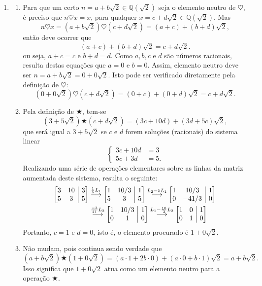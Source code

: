 \documentclass[12pt,a4paper]{article}
\makeatletter
\newcommand*\Q{\mathbb{Q}}
\newenvironment{amatrix}[1]{%
  \left[\begin{array}{@{}*{#1}{c}|c@{}}
}{%
  \end{array}\right]
}
\newcommand{\grstep}[2][\relax]{%
   \ensuremath{\mathrel{
       {\mathop{\longrightarrow}\limits^{#2\mathstrut}_{
                                     \begin{subarray}{l} #1 \end{subarray}}}}}}
\makeatother
\begin{document}
\begin{enumerate}
\item
\begin{enumerate}
\item Para que um certo $n = a + b\sqrt{2} \in \Q(\sqrt{2})$ seja o elemento neutro de $\heartsuit$, é preciso que $n \heartsuit x = x$, para qualquer $x = c+d\sqrt{2} \in \Q(\sqrt{2})$. Mas
\[
n \heartsuit x
= (a+b\sqrt{2}) \heartsuit (c+d\sqrt{2})
= (a+c) + (b+d)\sqrt{2},
\]
então deve ocorrer que
\[
(a+c) + (b+d)\sqrt{2} = c + d\sqrt{2}.
\]
ou seja, $a+c = c$ e $b+d = d$. Como $a,b,c$ e $d$ são números racionais, resulta destas equações que $a=0$ e $b=0$. Assim, elemento neutro deve ser $n = a + b\sqrt{2} = 0 + 0\sqrt{2}$. Isto pode ser verificado diretamente pela definição de $\heartsuit$:
\[
(0+0\sqrt{2}) \heartsuit (c+d\sqrt{2})
= (0+c) + (0+d)\sqrt{2}
= c + d\sqrt{2}.
\]
\item Pela definição de $\bigstar$, tem-se
\[
(3+5\sqrt{2}) \bigstar (c+d\sqrt{2})
= (3c+10d) + (3d+5c)\sqrt{2},
\]
que será igual a $3 + 5\sqrt{2}$ se $c$ e $d$ forem soluções (racionais) do sistema linear
\[
\begin{cases}
3c + 10d & = 3 \\
5c + 3d  & = 5.
\end{cases}
\]
Realizando uma série de operações elementares sobre as linhas da matriz aumentada deste sistema, resulta o seguinte:
\begin{align*}
\begin{amatrix}{2}
3 & 10 & 3 \\
5 & 3 & 5
\end{amatrix}
&
\grstep{ \frac{1}{5} L_1 }
\begin{amatrix}{2}
1 & 10/3 & 1 \\
5 & 3 & 5
\end{amatrix}
\grstep{ L_2 - 5 L_1 }
\begin{amatrix}{2}
1 & 10/3 & 1 \\
0 & -41/3 & 0
\end{amatrix} \\
&
\grstep{ \frac{-3}{41} L_2 }
\begin{amatrix}{2}
1 & 10/3 & 1 \\
0 & 1 & 0
\end{amatrix}
\grstep{ L_1 - \frac{10}{3} L_2 }
\begin{amatrix}{2}
1 & 0 & 1 \\
0 & 1 & 0
\end{amatrix}
\end{align*}
Portanto, $c=1$ e $d=0$, isto é, o elemento procurado é $1 + 0 \sqrt{2}$.
\item Não mudam, pois continua sendo verdade que
\[
  (a+b\sqrt{2}) \bigstar (1+0\sqrt{2})
= (a \cdot 1 +2b \cdot 0) + (a\cdot 0+b\cdot 1)\sqrt{2}
= a + b \sqrt{2}.
\]
Isso significa que $1+0\sqrt{2}$ atua como um elemento neutro para a operação $\bigstar$.


\end{enumerate}
\end{enumerate}
\end{document}
